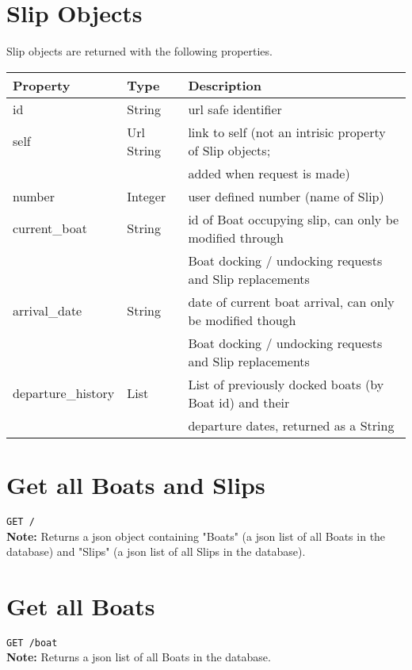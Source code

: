 \documentclass{article}
\begin{document}
\section*{Slip Objects}
Slip objects are returned with the following properties. \\
\begin{tabular}{| l | l | l |}
	\hline
	\textbf{Property}     & \textbf{Type}   & \textbf{Description} \\
	\hline
	id                    & String          & url safe identifier \\
	\hline
	self                  & Url String      & link to self (not an intrisic property of Slip objects; \\
	                      &                 & added when request is made) \\
	\hline
	number		      & Integer         & user defined number (name of Slip) \\
	\hline
	current\_boat         & String          & id of Boat occupying slip, can only be modified through \\
	                      &                 & Boat docking / undocking requests and Slip replacements \\
	\hline
	arrival\_date         & String          & date of current boat arrival, can only be modified though \\
	                      &                 & Boat docking / undocking requests and Slip replacements \\
	\hline
	departure\_history    & List            & List of previously docked boats (by Boat id) and their \\
	                      &                 & departure dates, returned as a String \\
	\hline
\end{tabular}

\section*{Get all Boats and Slips}
\texttt{GET /} \\
\textbf{Note:} Returns a json object containing "Boats" (a json list of all Boats in the
database) and "Slips" (a json list of all Slips in the database).

\section*{Get all Boats}
\texttt{GET /boat} \\
\textbf{Note:} Returns a json list of all Boats in the database.
\end{document}
